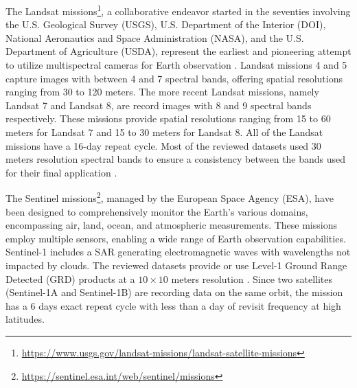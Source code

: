 \documentclass{CUP-JNL-DTM}%
\theoremstyle{definition}
\numberwithin{equation}{section}
\begin{document}
The Landsat missions\footnote{\url{https://www.usgs.gov/landsat-missions/landsat-satellite-missions}}, a collaborative endeavor started in the seventies involving the U.S. Geological Survey (USGS), U.S. Department of the Interior (DOI), National Aeronautics and Space Administration (NASA), and the U.S. Department of Agriculture (USDA), represent the earliest and pioneering attempt to utilize multispectral cameras for Earth observation \cite{wulder_fifty_2022}.
Landsat missions 4 and 5 capture images with between 4 and 7 spectral bands, offering spatial resolutions ranging from 30 to 120 meters. %
The more recent Landsat missions, namely Landsat 7 and Landsat 8, are record images with 8 and 9 spectral bands respectively. These missions provide spatial resolutions ranging from 15 to 60 meters for Landsat 7 and 15 to 30 meters for Landsat 8.
All of the Landsat missions have a 16-day repeat cycle.
Most of the reviewed datasets used 30 meters resolution spectral bands to ensure a consistency between the bands used for their final application \cite{robinson_large_2019, potapov_annual_2019, irvin_forestnet_2020, de_almeida_pereira_active_2021, feng_m_arctic-boreal_2022, potapov_global_2022, lee_multiearth_2022}.


The Sentinel missions\footnote{\url{https://sentinel.esa.int/web/sentinel/missions}}, managed by the European Space Agency (ESA), have been designed to comprehensively monitor the Earth's various domains, encompassing air, land, ocean, and atmospheric measurements. These missions employ multiple sensors, enabling a wide range of Earth observation capabilities.
Sentinel-1 includes a SAR generating electromagnetic waves with wavelengths not impacted by clouds. The reviewed datasets provide or use Level-1 Ground Range Detected (GRD) products at a $10 \times 10$ meters resolution \cite{schmitt_sen12ms_2019, sumbul_bigearthnet-mm_2021, lee_multiearth_2022}.
Since two satellites (Sentinel-1A and Sentinel-1B) are recording data on the same orbit, the mission has a 6 days exact repeat cycle with less than a day of revisit frequency at high latitudes.
\end{document}
